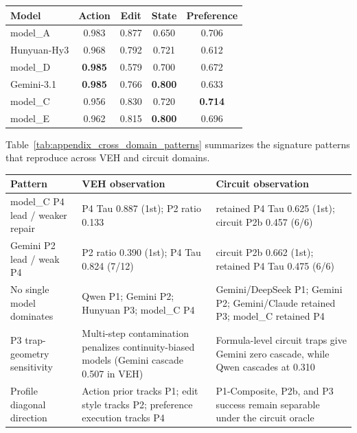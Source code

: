 \begin{center}
\label{tab:appendix_circuit_profile}
\scriptsize
\setlength{\tabcolsep}{5pt}
\renewcommand{\arraystretch}{1.08}
\begin{tabular}{lcccc}
\toprule
Model & Action & Edit & State & Preference \\
\midrule
model_A & 0.983 & 0.877 & 0.650 & 0.706 \\
Hunyuan-Hy3 & 0.968 & 0.792 & 0.721 & 0.612 \\
model_D & \textbf{0.985} & 0.579 & 0.700 & 0.672 \\
Gemini-3.1 & \textbf{0.985} & 0.766 & \textbf{0.800} & 0.633 \\
model_C & 0.956 & 0.830 & 0.720 & \textbf{0.714} \\
model_E & 0.962 & 0.815 & \textbf{0.800} & 0.696 \\
\bottomrule
\end{tabular}
\end{center}

Table~\ref{tab:appendix_cross_domain_patterns} summarizes the signature patterns that reproduce across VEH and circuit domains.

\begin{center}
\label{tab:appendix_cross_domain_patterns}
\scriptsize
\setlength{\tabcolsep}{4pt}
\renewcommand{\arraystretch}{1.08}
\begin{tabular}{p{35mm}p{54mm}p{54mm}}
\toprule
Pattern & VEH observation & Circuit observation \\
\midrule
model_C P4 lead / weaker repair & P4 Tau 0.887 (1st); P2 ratio 0.133 & retained P4 Tau 0.625 (1st); circuit P2b 0.457 (6/6) \\
Gemini P2 lead / weak P4 & P2 ratio 0.390 (1st); P4 Tau 0.824 (7/12) & circuit P2b 0.662 (1st); retained P4 Tau 0.475 (6/6) \\
No single model dominates & Qwen P1; Gemini P2; Hunyuan P3; model_C P4 & Gemini/DeepSeek P1; Gemini P2; Gemini/Claude retained P3; model_C retained P4 \\
P3 trap-geometry sensitivity & Multi-step contamination penalizes continuity-biased models (Gemini cascade 0.507 in VEH) & Formula-level circuit traps give Gemini zero cascade, while Qwen cascades at 0.310 \\
Profile diagonal direction & Action prior tracks P1; edit style tracks P2; preference execution tracks P4 & P1-Composite, P2b, and P3 success remain separable under the circuit oracle \\
\bottomrule
\end{tabular}
\end{center}

